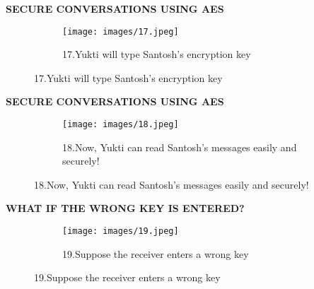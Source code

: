 \documentclass{beamer}
\begin{document}
\begin{frame}
\begin{tcolorbox}
\begin{center}
\textsc{\textbf{\textcolor{byzantium}{SECURE CONVERSATIONS USING AES}}}
\end{center}
\end{tcolorbox}
\begin{figure}
\centering
\begin{subfigure}{\textwidth}
  \centering
  \texttt{[image: images/17.jpeg]}
  \caption{17.Yukti will type Santosh’s encryption key }
  \label{fig:sub1}
\end{subfigure}
\end{figure}
\end{frame}

\begin{frame}
\begin{tcolorbox}
\begin{center}
\textsc{\textbf{\textcolor{byzantium}{SECURE CONVERSATIONS USING AES}}}
\end{center}
\end{tcolorbox}
\begin{figure}
\centering
\begin{subfigure}{\textwidth}
  \centering
  \texttt{[image: images/18.jpeg]}
  \caption{18.Now, Yukti can read Santosh’s messages easily and securely! }
  \label{fig:sub1}
\end{subfigure}
\end{figure}
\end{frame}

\begin{frame}
\begin{tcolorbox}
\begin{center}
\textsc{\textbf{\textcolor{byzantium}{WHAT IF THE WRONG KEY IS ENTERED?}}}
\end{center}
\end{tcolorbox}
\begin{figure}
\centering
\begin{subfigure}{\textwidth}
  \centering
  \texttt{[image: images/19.jpeg]}
  \caption{19.Suppose the receiver enters a wrong key}
  \label{fig:sub1}
\end{subfigure}
\end{figure}
\end{frame}
\end{document}
